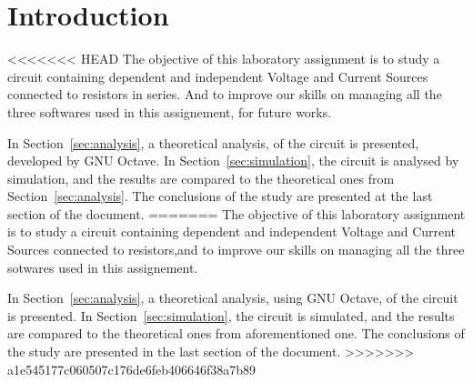 \section{Introduction}
\label{sec:introduction}


<<<<<<< HEAD
The objective of this laboratory assignment is to study a circuit containing dependent and independent Voltage and Current Sources connected to resistors in series. And to improve our skills on managing all the three softwares used in this assignement, for future works.
\vspace{1cm}


In Section~\ref{sec:analysis}, a theoretical analysis, of the circuit is presented, developed by GNU Octave. In Section~\ref{sec:simulation}, the circuit is analysed by
simulation, and the results are compared to the theoretical ones from
Section~\ref{sec:analysis}. The conclusions of the study are presented at the last section of the document.
=======
The objective of this laboratory assignment is to study a circuit containing dependent and independent Voltage and Current Sources connected to resistors,and to improve our skills on managing all the three sotwares used in this assignement.
\vspace{1cm}


In Section~\ref{sec:analysis}, a theoretical analysis, using GNU Octave, of the circuit is presented. In Section~\ref{sec:simulation}, the circuit is simulated, and the results are compared to the theoretical ones from
aforementioned one. The conclusions of the study are presented in the last section of the document.
>>>>>>> a1e545177c060507c176de6feb406646f38a7b89
